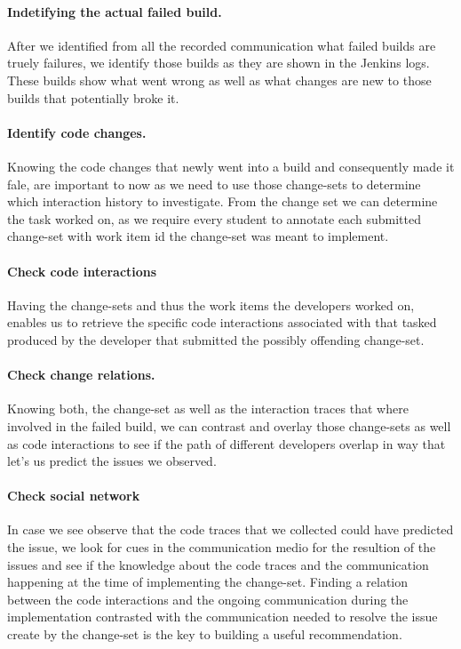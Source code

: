 \paragraph{Indetifying the actual failed build.}
After we identified from all the recorded communication what failed builds are truely failures, we identify those builds as they are shown in the Jenkins logs.
These builds show what went wrong as well as what changes are new to those builds that potentially broke it.

\paragraph{Identify code changes.}
Knowing the code changes that newly went into a build and consequently made it fale, are important to now as we need to use those change-sets to determine which interaction history to investigate.
From the change set we can determine the task worked on, as we require every student to annotate each submitted change-set with work item id the change-set was meant to implement.

\paragraph{Check code interactions}
Having the change-sets and thus the work items the developers worked on, enables us to retrieve the specific code interactions associated with that tasked produced by the developer that submitted the possibly offending change-set.

\paragraph{Check change relations.}
Knowing both, the change-set as well as the interaction traces that where involved in the failed build, we can contrast and overlay those change-sets as well as code interactions to see if the path of different developers overlap in way that let's us predict the issues we observed.

\paragraph{Check social network}
In case we see observe that the code traces that we collected could have predicted the issue, we look for cues in the communication medio for the resultion of the issues and see if the knowledge about the code traces and the communication happening at the time of implementing the change-set.
Finding a relation between the code interactions and the ongoing communication during the implementation contrasted with the communication needed to resolve the issue create by the change-set is the key to building a useful recommendation.

